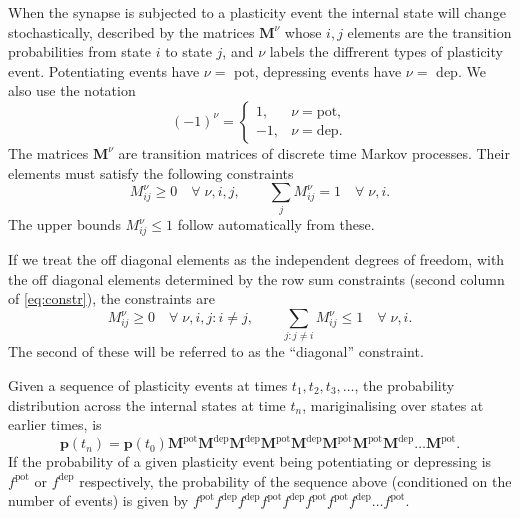 \documentclass[12pt]{article}
\newcommand{\prm}{p}
\newcommand{\pr}{\mathbf{\prm}}
\newcommand{\MMdm}{M}
\newcommand{\MMd}{\mathbf{\MMdm}}
\newcommand{\pot}{^{\text{pot}}}
\newcommand{\dep}{^{\text{dep}}}
\begin{document}
When the synapse is subjected to a plasticity event the internal state will change stochastically, described by the matrices $\MMd^\nu$ whose $i,j$ elements are the transition probabilities from state $i$ to state $j$, 
and \(\nu \) labels the diffrerent types of plasticity event.
Potentiating events have \(\nu=\) pot, depressing events have \(\nu=\) dep.
We also use the notation
%
\begin{equation*}
  (-1)^\nu = 
    \begin{cases}
       1, & \nu = \text{pot}, \\
      -1, & \nu = \text{dep}.
    \end{cases}
\end{equation*}
%
The matrices $\MMd^\nu$ are transition matrices of discrete time Markov processes.
Their elements must satisfy the following constraints
%
\begin{equation}\label{eq:constr}
  \MMdm^\nu_{ij} \geq 0 
    \quad \forall \; \nu, i, j, \qquad
  \sum_j \MMdm^\nu_{ij} = 1
    \quad \forall \; \nu, i.
\end{equation}
%
The upper bounds $\MMdm^\nu_{ij} \leq 1$ follow automatically from these.

If we treat the off diagonal elements as the independent degrees of freedom, with the off diagonal elements determined by the row sum constraints (second column of \eqref{eq:constr}), the constraints are
%
\begin{equation}\label{eq:constri}
  \MMdm^\nu_{i j} \geq 0
    \quad \forall \; \nu, i, j : i \neq j, \qquad
  \sum_{j : j\neq i} \MMdm^\nu_{ij} \leq 1
    \quad \forall \; \nu, i.
\end{equation}
%
The second of these will be referred to as the ``diagonal'' constraint.

Given a sequence of plasticity events at times $t_1,t_2,t_3,\ldots$, the probability distribution across the internal states at time $t_n$, 
mariginalising over states at earlier times, is
%
\begin{equation}\label{eq:plastseq}
  \pr(t_n) = \pr(t_0)  \MMd \pot \MMd \dep \MMd \dep \MMd \pot \MMd \dep \MMd \pot \MMd \pot \MMd \dep \ldots \MMd \pot .
\end{equation}
%
If the probability of a given plasticity event being potentiating or depressing is $f\pot$ or $f\dep$ respectively, the probability of the sequence above (conditioned on the number of events) is given by $f\pot f\dep f\dep f\pot f\dep f\pot f\pot f\dep \ldots f\pot$.
\end{document}
